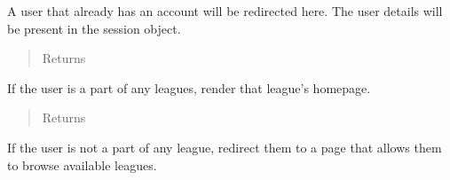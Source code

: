 \documentclass[letterpaper,10pt,english]{sphinxmanual}
\begin{document}

\begin{fulllineitems}
\label{\detokenize{tiger_leagues/readme:tiger_leagues.league.index}}
A user that already has an account will be redirected here. The user details 
will be present in the session object.
\begin{quote}\begin{description}
\item[{Returns}] \leavevmode
{}

\end{description}\end{quote}

If the user is a part of any leagues, render that league’s homepage.
\begin{quote}\begin{description}
\item[{Returns}] \leavevmode
{}

\end{description}\end{quote}

If the user is not a part of any league, redirect them to a page that allows 
them to browse available leagues.

\end{fulllineitems}

\end{document}
